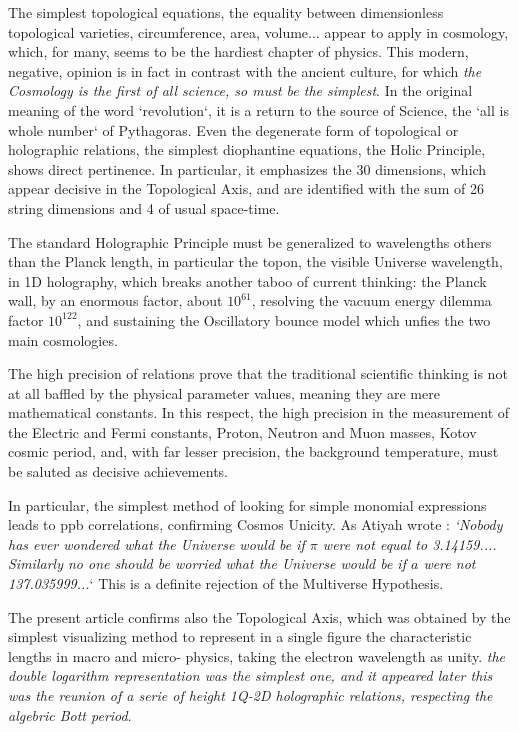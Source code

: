 \documentclass[twoside,draft]{article}
\begin{document}
\begin{sloppypar}
The simplest topological equations, the equality between dimensionless topological varieties,
circumference, area, volume... appear to apply in cosmology, which, for many, seems to be the hardiest
chapter of physics. This modern, negative, opinion is in fact in contrast with the ancient culture, for
which \textit{the Cosmology is the first of all science, so must be the simplest}. In the original meaning of the
word `revolution`, it is a return to the source of Science, the `all is whole number` of Pythagoras.
Even the degenerate form of topological or holographic relations, the simplest diophantine
equations, the Holic Principle, shows direct pertinence. In particular, it emphasizes the 30
dimensions, which appear decisive in the Topological Axis, and are identified with the sum of 26 string
dimensions and 4 of usual space-time.

The standard Holographic Principle must be generalized to wavelengths others than the Planck
length, in particular the topon, the visible Universe wavelength, in 1D holography, which breaks
another taboo of current thinking: the Planck wall, by an enormous factor, about $10^{61}$, resolving the
vacuum energy dilemma factor $10^{122}$, and sustaining the Oscillatory bounce model which unfies the two main cosmologies.

The high precision of relations prove that the traditional scientific thinking is not at all baffled by
the physical parameter values, meaning they are mere mathematical constants. In this respect, the
high precision in the measurement of the Electric and Fermi constants, Proton, Neutron and Muon masses, Kotov cosmic period, and, with far lesser precision, the background temperature, must be saluted as decisive achievements.

In particular, the simplest method of looking for simple monomial expressions leads to ppb correlations, confirming Cosmos Unicity. As Atiyah wrote \cite{Atiyah1}: \textit{`Nobody has
ever wondered what the Universe would be if $\pi$ were not equal to 3.14159.... Similarly no one
should be worried what the Universe would be if $a$ were not 137.035999...}` This is a definite
rejection of the Multiverse Hypothesis.

The present article confirms also the Topological Axis, which was obtained by the simplest visualizing method to represent in a single figure the characteristic lengths in macro and micro-
physics, taking the electron wavelength as unity. \textit {the double logarithm representation was the simplest one, and it appeared later this was the reunion of a serie of height 1Q-2D holographic relations, respecting the algebric Bott period}.


\end{sloppypar}
\end{document}
